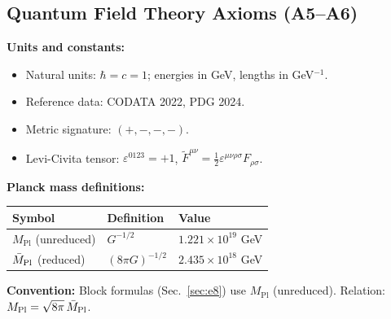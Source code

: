 \subsection{Quantum Field Theory Axioms (A5--A6)}

\begin{tcolorbox}[colback=yellow!5, colframe=yellow!60!black, 
    title={\textbf{Conventions: Units, Masses, and Normalizations}}, fonttitle=\bfseries]

\textbf{Units and constants:}
\begin{itemize}[leftmargin=1.5em, topsep=2pt, itemsep=1pt]
    \item Natural units: $\hbar = c = 1$; energies in GeV, lengths in GeV$^{-1}$.
    \item Reference data: CODATA 2022, PDG 2024.
    \item Metric signature: $(+,-,-,-)$.
    \item Levi-Civita tensor: $\varepsilon^{0123} = +1$, $\tilde{F}^{\mu\nu} = \frac{1}{2}\varepsilon^{\mu\nu\rho\sigma}F_{\rho\sigma}$.
\end{itemize}

\textbf{Planck mass definitions:}
\begin{center}
\begin{tabular}{@{}lll@{}}
\toprule
\textbf{Symbol} & \textbf{Definition} & \textbf{Value}\\
\midrule
$M_{\mathrm{Pl}}$ (unreduced) & $G^{-1/2}$ & $1.221 \times 10^{19}$ GeV\\
$\bar{M}_{\mathrm{Pl}}$ (reduced) & $(8\pi G)^{-1/2}$ & $2.435 \times 10^{18}$ GeV\\
\bottomrule
\end{tabular}
\end{center}
\textbf{Convention:} Block formulas (Sec.~\ref{sec:e8}) use $M_{\mathrm{Pl}}$ (unreduced). 
Relation: $M_{\mathrm{Pl}} = \sqrt{8\pi}\,\bar{M}_{\mathrm{Pl}}$.


\end{tcolorbox}
